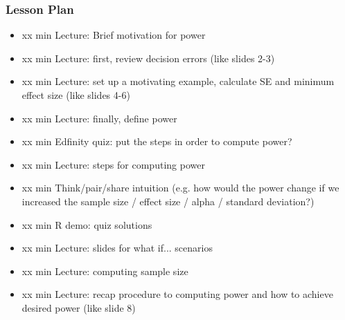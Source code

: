 \begin{frame}
    \frametitle{Lesson Plan}
    \begin{itemize}
        \item xx min Lecture: Brief motivation for power
        \item xx min Lecture: first, review decision errors (like slides 2-3)
        \item xx min Lecture: set up a motivating example, calculate SE and minimum effect size (like slides 4-6)
        \item xx min Lecture: finally, define power
        \item xx min Edfinity quiz: put the steps in order to compute power?
        \item xx min Lecture: steps for computing power
        \item xx min Think/pair/share intuition (e.g. how would the power change if we increased the sample size / effect size / alpha / standard deviation?)
        \item xx min R demo: quiz solutions
        \item xx min Lecture: slides for what if... scenarios
        \item xx min Lecture: computing sample size
        \item xx min Lecture: recap procedure to computing power and how to achieve desired power (like slide 8)
    \end{itemize}
\end{frame}


